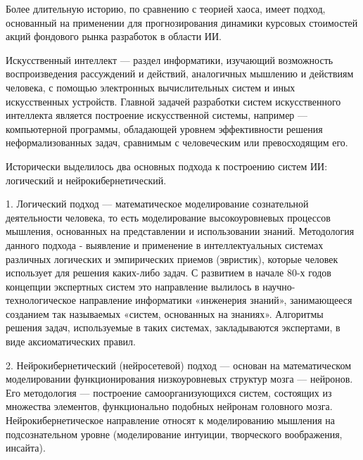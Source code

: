 \par Более длительную историю, по сравнению с теорией хаоса, имеет подход, основанный на применении для прогнозирования динамики курсовых стоимостей акций фондового рынка разработок в
области ИИ.
\par Искусственный интеллект --- раздел информатики, изучающий возможность
воспроизведения рассуждений и действий, аналогичных мышлению и действиям
человека, с помощью электронных вычислительных систем и иных искусственных
устройств. Главной задачей разработки систем искусственного интеллекта является
построение искусственной системы, например –-- компьютерной программы, обладающей
уровнем эффективности решения неформализованных задач, сравнимым с человеческим
или превосходящим его.
\par Исторически выделилось два основных подхода к построению систем ИИ:
логический и нейрокибернетический.
\par 1. Логический подход –-- математическое моделирование сознательной деятельности
человека, то есть моделирование высокоуровневых процессов мышления, основанных на
представлении и использовании знаний. Методология данного подхода - выявление и
применение в интеллектуальных системах различных логических и эмпирических
приемов (эвристик), которые человек использует для решения каких-либо задач. С
развитием в начале 80-х годов концепции экспертных систем это направление вылилось в
научно-технологическое направление информатики «инженерия знаний», занимающееся
созданием так называемых «систем, основанных на знаниях». Алгоритмы решения задач,
используемые в таких системах, закладываются экспертами, в виде аксиоматических
правил.
\par 2. Нейрокибернетический (нейросетевой) подход --- основан на математическом
моделировании функционирования низкоуровневых структур мозга --- нейронов. Его
методология --- построение самоорганизующихся систем, состоящих из множества
элементов, функционально подобных нейронам головного мозга. Нейрокибернетическое
направление относят к моделированию мышления на подсознательном уровне
(моделирование интуиции, творческого воображения, инсайта). 

